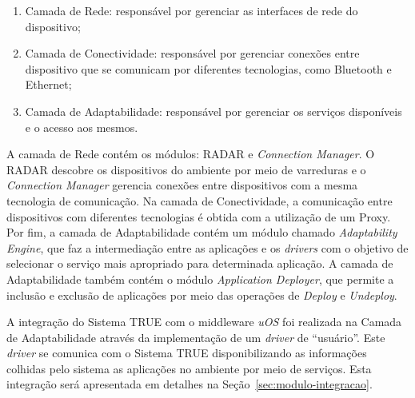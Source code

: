 	\begin{enumerate}
		\item Camada de Rede: responsável por gerenciar as interfaces de rede do dispositivo;
		\item Camada de Conectividade: responsável por gerenciar conexões entre dispositivo que se comunicam por diferentes tecnologias, como Bluetooth e Ethernet;
		\item Camada de Adaptabilidade: responsável por gerenciar os serviços disponíveis e o acesso aos mesmos.
	\end{enumerate}

	A camada de Rede contém os módulos: RADAR e \textit{Connection Manager}. O RADAR descobre os dispositivos do ambiente por meio de varreduras e o \textit{Connection Manager} gerencia conexões entre dispositivos com a mesma tecnologia de comunicação. Na camada de Conectividade, a comunicação entre dispositivos com diferentes tecnologias é obtida com a utilização de um Proxy. Por fim, a camada de Adaptabilidade contém um módulo chamado \textit{Adaptability Engine}, que faz a intermediação entre as aplicações e os \textit{drivers} com o objetivo de selecionar o serviço mais apropriado para determinada aplicação. A camada de Adaptabilidade também contém o módulo \textit{Application Deployer}, que permite a inclusão e exclusão de aplicações por meio das operações de \textit{Deploy} e \textit{Undeploy}.

	A integração do Sistema TRUE com o middleware \textit{uOS} foi realizada na Camada de Adaptabilidade através da implementação de um \textit{driver} de ``usuário''. Este \textit{driver} se comunica com o Sistema TRUE disponibilizando as informações colhidas pelo sistema as aplicações no ambiente por meio de serviços. Esta integração será apresentada em detalhes na Seção~\ref{sec:modulo-integracao}.




